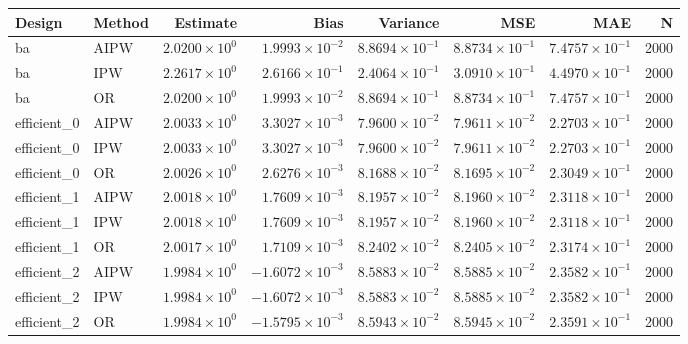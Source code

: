 \begin{table}[ht]
\centering
\begin{tabular}{llrrrrrr}
  \toprule
Design & Method & Estimate & Bias & Variance & MSE & MAE & N \\ 
  \midrule
ba & AIPW & $2.0200 \times 10^{0}$ & $1.9993 \times 10^{-2}$ & $8.8694 \times 10^{-1}$ & $8.8734 \times 10^{-1}$ & $7.4757 \times 10^{-1}$ & 2000 \\ 
  ba & IPW & $2.2617 \times 10^{0}$ & $2.6166 \times 10^{-1}$ & $2.4064 \times 10^{-1}$ & $3.0910 \times 10^{-1}$ & $4.4970 \times 10^{-1}$ & 2000 \\ 
  ba & OR & $2.0200 \times 10^{0}$ & $1.9993 \times 10^{-2}$ & $8.8694 \times 10^{-1}$ & $8.8734 \times 10^{-1}$ & $7.4757 \times 10^{-1}$ & 2000 \\ 
   \midrule
efficient\_0 & AIPW & $2.0033 \times 10^{0}$ & $3.3027 \times 10^{-3}$ & $7.9600 \times 10^{-2}$ & $7.9611 \times 10^{-2}$ & $2.2703 \times 10^{-1}$ & 2000 \\ 
  efficient\_0 & IPW & $2.0033 \times 10^{0}$ & $3.3027 \times 10^{-3}$ & $7.9600 \times 10^{-2}$ & $7.9611 \times 10^{-2}$ & $2.2703 \times 10^{-1}$ & 2000 \\ 
  efficient\_0 & OR & $2.0026 \times 10^{0}$ & $2.6276 \times 10^{-3}$ & $8.1688 \times 10^{-2}$ & $8.1695 \times 10^{-2}$ & $2.3049 \times 10^{-1}$ & 2000 \\ 
   \midrule
efficient\_1 & AIPW & $2.0018 \times 10^{0}$ & $1.7609 \times 10^{-3}$ & $8.1957 \times 10^{-2}$ & $8.1960 \times 10^{-2}$ & $2.3118 \times 10^{-1}$ & 2000 \\ 
  efficient\_1 & IPW & $2.0018 \times 10^{0}$ & $1.7609 \times 10^{-3}$ & $8.1957 \times 10^{-2}$ & $8.1960 \times 10^{-2}$ & $2.3118 \times 10^{-1}$ & 2000 \\ 
  efficient\_1 & OR & $2.0017 \times 10^{0}$ & $1.7109 \times 10^{-3}$ & $8.2402 \times 10^{-2}$ & $8.2405 \times 10^{-2}$ & $2.3174 \times 10^{-1}$ & 2000 \\ 
   \midrule
efficient\_2 & AIPW & $1.9984 \times 10^{0}$ & $-1.6072 \times 10^{-3}$ & $8.5883 \times 10^{-2}$ & $8.5885 \times 10^{-2}$ & $2.3582 \times 10^{-1}$ & 2000 \\ 
  efficient\_2 & IPW & $1.9984 \times 10^{0}$ & $-1.6072 \times 10^{-3}$ & $8.5883 \times 10^{-2}$ & $8.5885 \times 10^{-2}$ & $2.3582 \times 10^{-1}$ & 2000 \\ 
  efficient\_2 & OR & $1.9984 \times 10^{0}$ & $-1.5795 \times 10^{-3}$ & $8.5943 \times 10^{-2}$ & $8.5945 \times 10^{-2}$ & $2.3591 \times 10^{-1}$ & 2000 \\ 

\end{tabular}
\end{table}
